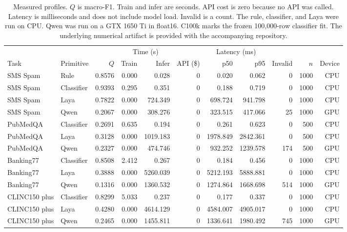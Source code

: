 \begin{table}[htbp]
\centering
\footnotesize
\setlength{\tabcolsep}{3.1pt}
\caption{Measured profiles. \(Q\) is macro-F1. Train and infer are seconds. API cost is zero because no API was called. Latency is milliseconds and does not include model load. Invalid is a count. The rule, classifier, and Laya were run on CPU. Qwen was run on a GTX 1650 Ti in float16. C100k marks the frozen 100{,}000-row classifier fit. The underlying numerical artifact is provided with the accompanying repository.}
\label{tab:performance}
\begin{tabular}{@{}llrrrrrrrrr@{}}
\toprule
& & & \multicolumn{2}{c}{Time (s)} & & \multicolumn{2}{c}{Latency (ms)} & & & \\
\cmidrule(lr){4-5}\cmidrule(lr){7-8}
Task & Primitive & \(Q\) & Train & Infer & API (\$) & p50 & p95 & Invalid & \(n\) & Device \\
\midrule
SMS Spam & Rule & 0.8576 & 0.000 & 0.028 & 0 & 0.020 & 0.062 & 0 & 1000 & CPU \\
SMS Spam & Classifier & 0.9393 & 0.295 & 0.351 & 0 & 0.188 & 0.719 & 0 & 1000 & CPU \\
SMS Spam & Laya & 0.7822 & 0.000 & 724.349 & 0 & 698.724 & 941.798 & 0 & 1000 & CPU \\
SMS Spam & Qwen & 0.2067 & 0.000 & 308.276 & 0 & 323.515 & 417.066 & 25 & 1000 & GPU \\
PubMedQA & Classifier & 0.2691 & 0.635 & 0.194 & 0 & 0.261 & 0.623 & 0 & 500 & CPU \\
PubMedQA & Laya & 0.3128 & 0.000 & 1019.183 & 0 & 1978.849 & 2842.361 & 0 & 500 & CPU \\
PubMedQA & Qwen & 0.2327 & 0.000 & 474.746 & 0 & 932.252 & 1239.578 & 174 & 500 & GPU \\
Banking77 & Classifier & 0.8508 & 2.412 & 0.267 & 0 & 0.184 & 0.456 & 0 & 1000 & CPU \\
Banking77 & Laya & 0.3888 & 0.000 & 5260.039 & 0 & 5212.193 & 5888.881 & 0 & 1000 & CPU \\
Banking77 & Qwen & 0.1316 & 0.000 & 1360.532 & 0 & 1274.864 & 1668.698 & 514 & 1000 & GPU \\
CLINC150 plus & Classifier & 0.8299 & 5.033 & 0.237 & 0 & 0.177 & 0.337 & 0 & 1000 & CPU \\
CLINC150 plus & Laya & 0.4280 & 0.000 & 4614.129 & 0 & 4584.007 & 4905.017 & 0 & 1000 & CPU \\
CLINC150 plus & Qwen & 0.2465 & 0.000 & 1455.811 & 0 & 1336.641 & 1980.492 & 745 & 1000 & GPU \\

\end{tabular}
\end{table}
